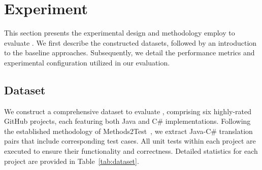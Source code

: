 \section{Experiment}
This section presents the experimental design and methodology employ to evaluate \toolname. We first describe the constructed datasets, followed by an introduction to the baseline approaches. Subsequently, we detail the performance metrics and experimental configuration utilized in our evaluation.

\subsection{Dataset}
\label{sec:dataset}
We construct a comprehensive dataset to evaluate \toolname, comprising six highly-rated GitHub projects, each featuring both Java and C\# implementations. Following the established methodology of Methods2Test~\cite{tufano2022methods2test}, we extract Java-C\# translation pairs that include corresponding test cases. All unit tests within each project are executed to ensure their functionality and correctness. Detailed statistics for each project are provided in Table~\ref{tab:dataset}.

\begin{table}[htbp]
  \centering
  \caption{The statistics of the constructed dataset}
  \label{tab:dataset}%
\end{table}%

